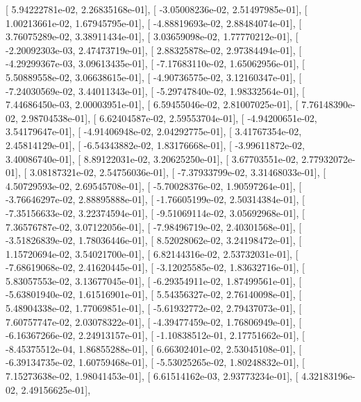 \documentclass{article}
\begin{document}
       [  5.94222781e-02,   2.26835168e-01],
       [ -3.05008236e-02,   2.51497985e-01],
       [  1.00213661e-02,   1.67945795e-01],
       [ -4.88819693e-02,   2.88484074e-01],
       [  3.76075289e-02,   3.38911434e-01],
       [  3.03659098e-02,   1.77770212e-01],
       [ -2.20092303e-03,   2.47473719e-01],
       [  2.88325878e-02,   2.97384494e-01],
       [ -4.29299367e-03,   3.09613435e-01],
       [ -7.17683110e-02,   1.65062956e-01],
       [  5.50889558e-02,   3.06638615e-01],
       [ -4.90736575e-02,   3.12160347e-01],
       [ -7.24030569e-02,   3.44011343e-01],
       [ -5.29747840e-02,   1.98332564e-01],
       [  7.44686450e-03,   2.00003951e-01],
       [  6.59455046e-02,   2.81007025e-01],
       [  7.76148390e-02,   2.98704538e-01],
       [  6.62404587e-02,   2.59553704e-01],
       [ -4.94200651e-02,   3.54179647e-01],
       [ -4.91406948e-02,   2.04292775e-01],
       [  3.41767354e-02,   2.45814129e-01],
       [ -6.54343882e-02,   1.83176668e-01],
       [ -3.99611872e-02,   3.40086740e-01],
       [  8.89122031e-02,   3.20625250e-01],
       [  3.67703551e-02,   2.77932072e-01],
       [  3.08187321e-02,   2.54756036e-01],
       [ -7.37933799e-02,   3.31468033e-01],
       [  4.50729593e-02,   2.69545708e-01],
       [ -5.70028376e-02,   1.90597264e-01],
       [ -3.76646297e-02,   2.88895888e-01],
       [ -1.76605199e-02,   2.50314384e-01],
       [ -7.35156633e-02,   3.22374594e-01],
       [ -9.51069114e-02,   3.05692968e-01],
       [  7.36576787e-02,   3.07122056e-01],
       [ -7.98496719e-02,   2.40301568e-01],
       [ -3.51826839e-02,   1.78036446e-01],
       [  8.52028062e-02,   3.24198472e-01],
       [  1.15720694e-02,   3.54021700e-01],
       [  6.82144316e-02,   2.53732031e-01],
       [ -7.68619068e-02,   2.41620445e-01],
       [ -3.12025585e-02,   1.83632716e-01],
       [  5.83057553e-02,   3.13677045e-01],
       [ -6.29354911e-02,   1.87499561e-01],
       [ -5.63801940e-02,   1.61516901e-01],
       [  5.54356327e-02,   2.76140098e-01],
       [  5.48904338e-02,   1.77069851e-01],
       [ -5.61932772e-02,   2.79437073e-01],
       [  7.60757747e-02,   2.03078322e-01],
       [ -4.39477459e-02,   1.76806949e-01],
       [ -6.16367266e-02,   2.24913157e-01],
       [ -1.10838512e-01,   2.17751662e-01],
       [ -8.45375512e-04,   1.86855288e-01],
       [  6.66302401e-02,   2.53045108e-01],
       [ -6.39134735e-02,   1.60759468e-01],
       [ -5.53025265e-02,   1.80248832e-01],
       [  7.15273638e-02,   1.98041453e-01],
       [  6.61514162e-03,   2.93773234e-01],
       [  4.32183196e-02,   2.49156625e-01],
\end{document}
